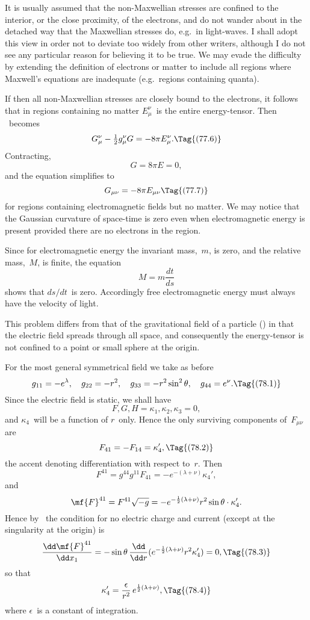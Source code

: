 \documentclass[12pt]{book}
\begin{document}
It is usually assumed that the non-Maxwellian stresses are confined to
the interior, or the close proximity, of the electrons, and do not wander about
in the detached way that the Maxwellian stresses do, e.g.\ in light-waves.
I shall adopt this view in order not to deviate too widely from other writers,
although I do not see any particular reason for believing it to be true\footnotemark.\footnotetext
  {We may evade the difficulty by extending the definition of electrons or matter to include all
  regions where Maxwell's equations are inadequate (e.g.\ regions containing quanta).}

If then all non-Maxwellian stresses are closely bound to the electrons, it
follows that in regions containing no matter $E_{\mu}^{\nu}$~is the entire energy-tensor.
Then ~becomes
\[
G_{\mu}^{\nu} - \tfrac{1}{2} g_{\mu}^{\nu} G = -8\pi E_{\mu}^{\nu}.
\Tag{(77.6)}
\]
Contracting,
\[
G = 8\pi E = 0,
\]
and the equation simplifies to
\[
G_{\mu\nu} = -8\pi E_{\mu\nu}
\Tag{(77.7)}
\]
for regions containing electromagnetic fields but no matter. We may notice
that the Gaussian curvature of space-time is zero even when electromagnetic
energy is present provided there are no electrons in the region.

Since for electromagnetic energy the invariant mass,~$m$, is zero, and the
relative mass,~$M$, is finite, the equation~
\[
M = m \frac{dt}{ds}
\]
shows that $ds/dt$~is zero. Accordingly free electromagnetic energy must always
have the velocity of light.

%

This problem differs from that of the gravitational field of a particle ()
%
in that the electric field spreads through all space, and consequently the
energy-tensor is not confined to a point or small sphere at the origin.

For the most general symmetrical field we take as before
\[
g_{11} = -e^{\lambda},\quad
g_{22} = -r^{2},\quad
g_{33} = -r^{2} \sin^{2}\theta,\quad
g_{44} = e^{\nu}.
\Tag{(78.1)}
\]
Since the electric field is static, we shall have
\[
F, G, H = \kappa_{1}, \kappa_{2}, \kappa_{3} = 0,
\]
and $\kappa_{4}$~will be a function of $r$~only. Hence the only surviving components of~$F_{\mu\nu}$
are
\[
F_{41} = -F_{14} = \kappa_{4}',
\Tag{(78.2)}
\]
the accent denoting differentiation with respect to~$r$. Then
\[
F^{41} = g^{44} g^{11} F_{41} = -e^{-(\lambda+\nu)} \kappa_{4}',
\]
and
\[
\mf{F}^{41} = F^{41} \sqrt{-g}
  = -e^{-\frac{1}{2}(\lambda+\nu)} r^{2} \sin\theta \cdot \kappa_{4}'.
\]
Hence by~ the condition for no electric charge and current (except at
the singularity at the origin) is
\[
\frac{\dd\mf{F}^{41}}{\dd x_{1}}
= -\sin\theta\, \frac{\dd}{\dd r}(e^{-\frac{1}{2}(\lambda+\nu)} r^{2}\kappa_{4}') = 0,
\Tag{(78.3)}
\]
so that
\[
\kappa_{4}' = \frac{\epsilon}{r^{2}}\, e^{\frac{1}{2}(\lambda+\nu)},
\Tag{(78.4)}
\]
where $\epsilon$~is a constant of integration.
\end{document}
